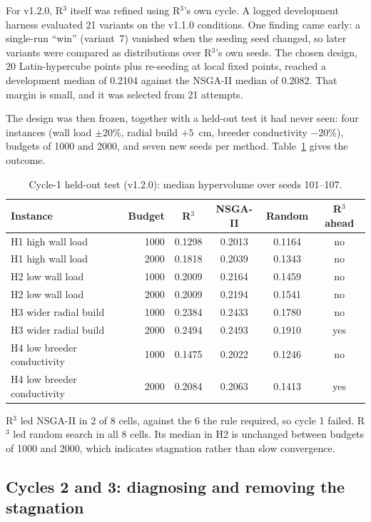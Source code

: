 \documentclass[11pt]{article}
\begin{document}
For v1.2.0, R$^3$ itself was refined using R$^3$'s own cycle. A logged development harness
evaluated 21 variants on the v1.1.0 conditions. One finding came early: a single-run
``win'' (variant~7) vanished when the seeding seed changed, so later variants were compared
as distributions over R$^3$'s own seeds. The chosen design, 20 Latin-hypercube points plus
re-seeding at local fixed points, reached a development median of 0.2104 against the NSGA-II
median of 0.2082. That margin is small, and it was selected from 21 attempts.

The design was then frozen, together with a held-out test it had never seen: four instances
(wall load $\pm20\%$, radial build $+5$~cm, breeder conductivity $-20\%$), budgets of 1000 and 2000,
and seven new seeds per method. Table~\ref{tab:ho} gives the outcome.

\begin{table}[h]
\centering
\caption{Cycle-1 held-out test (v1.2.0): median hypervolume over seeds 101--107.}
\label{tab:ho}
\begin{tabular}{lrcccc}
\toprule
Instance & Budget & R$^3$ & NSGA-II & Random & R$^3$ ahead \\
\midrule
H1 high wall load & 1000 & 0.1298 & 0.2013 & 0.1164 & no \\
H1 high wall load & 2000 & 0.1818 & 0.2039 & 0.1343 & no \\
H2 low wall load & 1000 & 0.2009 & 0.2164 & 0.1459 & no \\
H2 low wall load & 2000 & 0.2009 & 0.2194 & 0.1541 & no \\
H3 wider radial build & 1000 & 0.2384 & 0.2433 & 0.1780 & no \\
H3 wider radial build & 2000 & 0.2494 & 0.2493 & 0.1910 & yes \\
H4 low breeder conductivity & 1000 & 0.1475 & 0.2022 & 0.1246 & no \\
H4 low breeder conductivity & 2000 & 0.2084 & 0.2063 & 0.1413 & yes \\
\bottomrule
\end{tabular}
\end{table}

R$^3$ led NSGA-II in 2 of 8 cells, against the 6 the rule required, so cycle 1 failed. R$^3$ led
random search in all 8 cells. Its median in H2 is unchanged between budgets of 1000 and 2000,
which indicates stagnation rather than slow convergence.

\subsection{Cycles 2 and 3: diagnosing and removing the stagnation}
\end{document}
